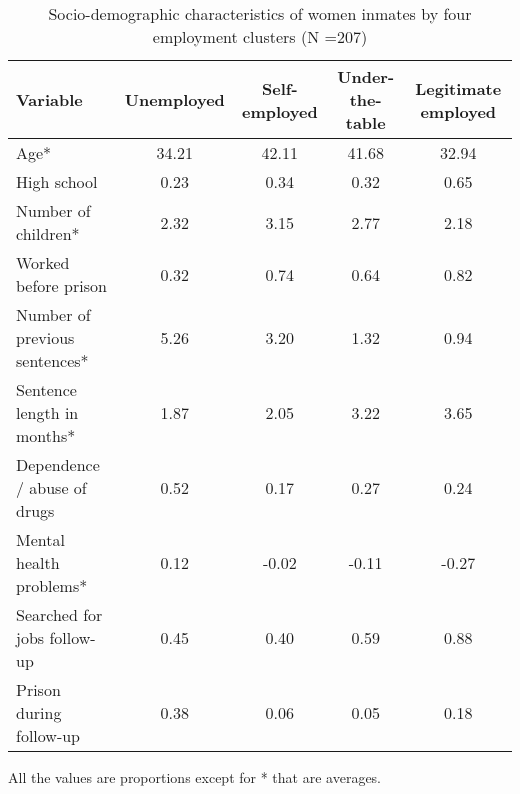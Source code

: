 \begin{table}[htp]
\footnotesize
\setlength{\tabcolsep}{10pt}
\renewcommand{\arraystretch}{1.3}
\begin{threeparttable}
\centering
\caption{Socio-demographic characteristics of women inmates \newline by four employment clusters (N =207)} 
\label{tab:descriptives_job_4}
\begin{tabular}{lcccc}
  \hline
Variable & Unemployed & Self-employed & Under-the-table & Legitimate employed \\ 
  \hline
Age* & 34.21 & 42.11 & 41.68 & 32.94 \\ 
  High school & 0.23 & 0.34 & 0.32 & 0.65 \\ 
  Number of children* & 2.32 & 3.15 & 2.77 & 2.18 \\ 
  Worked before prison & 0.32 & 0.74 & 0.64 & 0.82 \\ 
  Number of previous sentences* & 5.26 & 3.20 & 1.32 & 0.94 \\ 
  Sentence length in months* & 1.87 & 2.05 & 3.22 & 3.65 \\ 
  Dependence / abuse of drugs & 0.52 & 0.17 & 0.27 & 0.24 \\ 
  Mental health problems* & 0.12 & -0.02 & -0.11 & -0.27 \\ 
  Searched for jobs follow-up & 0.45 & 0.40 & 0.59 & 0.88 \\ 
  Prison during follow-up & 0.38 & 0.06 & 0.05 & 0.18 \\ 
   \hline
\end{tabular}
\begin{tablenotes}
\scriptsize
\item All the values are proportions except for * that are averages.
\end{tablenotes}
\end{threeparttable}
\end{table}
